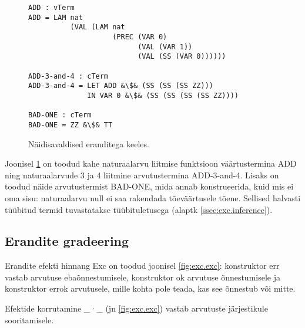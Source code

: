 \documentclass[a4paper,12pt]{article}
\begin{document}
\begin{figure}
  \begin{lstlisting}
ADD : vTerm
ADD = LAM nat
          (VAL (LAM nat
                    (PREC (VAR 0)
                          (VAL (VAR 1))
                          (VAL (SS (VAR 0))))))

ADD-3-and-4 : cTerm
ADD-3-and-4 = LET ADD &\$& (SS (SS (SS ZZ)))
              IN VAR 0 &\$& (SS (SS (SS (SS ZZ))))

BAD-ONE : cTerm
BAD-ONE = ZZ &\$& TT
  \end{lstlisting}
  \caption{Näidisavaldised eranditega keeles.}
  \label{fig:exc.raw.ex1}
\end{figure}

Joonisel \ref{fig:exc.raw.ex1} on toodud kahe naturaalarvu liitmise funktsioon väärtustermina ADD
ning naturaalarvude 3 ja 4 liitmine arvutustermina ADD-3-and-4.
Lisaks on toodud näide arvutustermist BAD-ONE, mida annab konstrueerida,
kuid mis ei oma sisu: naturaalarvu null ei saa rakendada tõeväärtusele tõene.
Sellised halvasti tüübitud termid tuvastatakse tüübituletusega (alaptk \ref{ssec:exc.inference}).

\subsection{Erandite gradeering} \label{ssec:exc.grading}

Erandite efekti hinnang Exc on toodud joonisel \ref{fig:exc.exc}: konstruktor err vastab arvutuse ebaõnnestumisele, konstruktor ok arvutuse õnnestumisele ja konstruktor errok arvutusele, mille kohta pole teada, kas see õnnestub või mitte.

Efektide korrutamine _·_ (jn \ref{fig:exc.exc}) vastab arvutuste järjestikule sooritamisele. 
\end{document}
